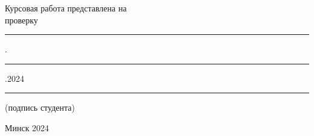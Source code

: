 \begin{titlepage}
\begin{center}
\begin{flushright}
\begin{minipage}{8.7cm}
            Курсовая работа представлена на \\
            проверку \rule{3ex}{0.3pt}.\rule{4ex}{0.3pt}.2024 \\
            \rule{8.7cm}{0.3pt}
            \vspace{-1.5cm}
            \begin{center}
            \tiny{(подпись студента)}\normalsize
            \end{center}
            
        \end{minipage}
    \end{flushright}

    \vfill
    {\normalsize Минск 2024}
  \end{center}
\end{titlepage}
